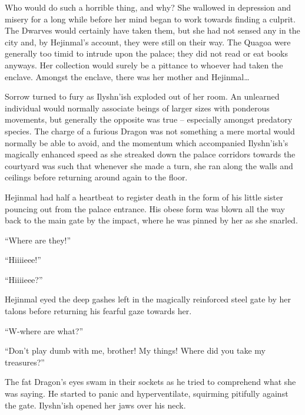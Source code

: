  

Who would do such a horrible thing, and why? She wallowed in depression and misery for a long while before her mind began to work towards finding a culprit. The Dwarves would certainly have taken them, but she had not sensed any in the city and, by Hejinmal’s account, they were still on their way. The Quagoa were generally too timid to intrude upon the palace; they did not read or eat books anyways. Her collection would surely be a pittance to whoever had taken the enclave. Amongst the enclave, there was her mother and Hejinmal…

 

Sorrow turned to fury as Ilyshn’ish exploded out of her room. An unlearned individual would normally associate beings of larger sizes with ponderous movements, but generally the opposite was true – especially amongst predatory species. The charge of a furious Dragon was not something a mere mortal would normally be able to avoid, and the momentum which accompanied Ilyshn’ish’s magically enhanced speed as she streaked down the palace corridors towards the courtyard was such that whenever she made a turn, she ran along the walls and ceilings before returning around again to the floor.

 

Hejinmal had half a heartbeat to register death in the form of his little sister pouncing out from the palace entrance. His obese form was blown all the way back to the main gate by the impact, where he was pinned by her as she snarled.

 

“Where are they!”

 

“Hiiiieee!”

 

“Hiiiieee?”

 

Hejinmal eyed the deep gashes left in the magically reinforced steel gate by her talons before returning his fearful gaze towards her.

 

“W-where are what?”

 

“Don’t play dumb with me, brother! My things! Where did you take my treasures?”

 

The fat Dragon’s eyes swam in their sockets as he tried to comprehend what she was saying. He started to panic and hyperventilate, squirming pitifully against the gate. Ilyshn’ish opened her jaws over his neck.

